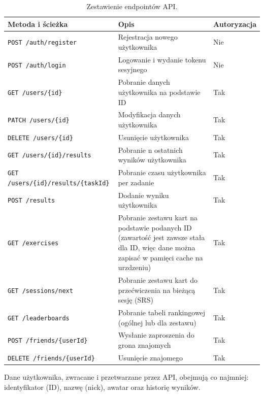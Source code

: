 \documentclass[polish]{aghengthesis}
\begin{document}
\begin{table}[h!]
\centering
\caption{Zestawienie endpointów API.}
\label{tab:api}
\begin{tabularx}{\textwidth}{l X l}
\toprule
Metoda i ścieżka & Opis & Autoryzacja \\
\midrule
\texttt{POST /auth/register} & Rejestracja nowego użytkownika & Nie \\
\texttt{POST /auth/login} & Logowanie i wydanie tokenu sesyjnego & Nie \\
\texttt{GET /users/\{id\}} & Pobranie danych użytkownika na podstawie ID & Tak \\
\texttt{PATCH /users/\{id\}} & Modyfikacja danych użytkownika & Tak \\
\texttt{DELETE /users/\{id\}} & Usunięcie użytkownika & Tak \\
\texttt{GET /users/\{id\}/results} & Pobranie n ostatnich wyników użytkownika & Tak \\
\texttt{GET /users/\{id\}/results/\{taskId\}} & Pobranie czasu użytkownika per zadanie & Tak \\
\texttt{POST /results} & Dodanie wyniku użytkownika & Tak \\
\texttt{GET /exercises} & Pobranie zestawu kart na podstawie podanych ID (zawartość jest zawsze stała dla ID, więc dane można zapisać w pamięci cache na urzdzeniu) & Tak \\
\texttt{GET /sessions/next} & Pobranie zestawu kart do przećwiczenia na bieżącą sesję (SRS) & Tak \\
\texttt{GET /leaderboards} & Pobranie tabeli rankingowej (ogólnej lub dla zestawu) & Tak \\
\texttt{POST /friends/\{userId\}} & Wysłanie zaproszenia do grona znajomych & Tak \\
\texttt{DELETE /friends/\{userId\}} & Usunięcie znajomego & Tak \\
\bottomrule
\end{tabularx}
\end{table}

Dane użytkownika, zwracane i przetwarzane przez API, obejmują co najmniej:
identyfikator (ID), nazwę (nick), awatar oraz historię wyników.

\FloatBarrier

\chapter{\ChapterTitleRealizationAspects}
\label{sec:wybrane-aspekty-realizacji}
\end{document}
